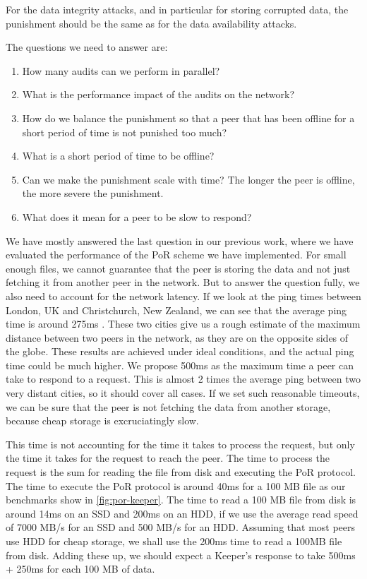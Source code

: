 For the data integrity attacks, and in particular for storing corrupted data,
the punishment should be the same as for the data availability attacks.

The questions we need to answer are:
\begin{enumerate}
    \item How many audits can we perform in parallel?
    \item What is the performance impact of the audits on the network?
    \item How do we balance the punishment so that a peer that has been offline for a short period of time
        is not punished too much?
    \item What is a short period of time to be offline?
    \item Can we make the punishment scale with time? The longer the peer is offline, the more severe the punishment.
    \item What does it mean for a peer to be slow to respond?
\end{enumerate}

We have mostly answered the last question in our previous work, where we have evaluated the performance of
the PoR scheme we have implemented.
For small enough files, we cannot guarantee that the peer is storing the data
and not just fetching it from another peer in the network.
But to answer the question fully, we also need to account for the network latency.
If we look at the ping times between London, UK and Christchurch, New Zealand,
we can see that the average ping time is around 275ms \cite{pingtimes}.
These two cities give us a rough estimate of the maximum distance between two peers in the network,
as they are on the opposite sides of the globe.
These results are achieved under ideal conditions, and the actual ping time could be much higher.
We propose 500ms as the maximum time a peer can take to respond to a request.
This is almost 2 times the average ping between two very distant cities, so it should cover all cases.
If we set such reasonable timeouts, we can be sure that the peer is not
fetching the data from another storage, because cheap storage is excruciatingly slow.

This time is not accounting for the time it takes to process the request, but only the time it takes for the
request to reach the peer.
The time to process the request is the sum for reading the file from disk and executing the PoR protocol.
The time to execute the PoR protocol is around 40ms for a 100 MB file as our benchmarks show in \autoref{fig:por-keeper}.
The time to read a 100 MB file from disk is around 14ms on an SSD and 200ms on an HDD, if we
use the average read speed of 7000 MB/s for an SSD and 500 MB/s for an HDD.
Assuming that most peers use HDD for cheap storage, we shall use the 200ms time to read a 100MB file from disk.
Adding these up, we should expect a Keeper's response to take 500ms + 250ms for each 100 MB of data.

